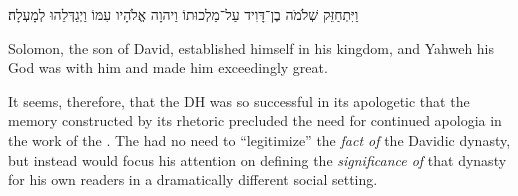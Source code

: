     \begin{hebrewtext}
        וַיִּתְחַזֵּק שְׁלֹמֹה בֶן־דָּוִיד עַל־מַלְכוּתוֹ וַיהוָה אֱלֹהָיו עִמּוֹ וַיְגַדְּלֵהוּ לְמָעְלָה׃
    \end{hebrewtext}
    \begin{translation}
        Solomon, the son of David, established himself in his kingdom, and Yahweh his God was with him and made him exceedingly great.   
    \end{translation}
\noindent
It seems, therefore, that the DH was so successful in its apologetic that the memory constructed by its rhetoric precluded the need for continued apologia in the work of the \chronicler. The \chronicler had no need to ``legitimize'' the \emph{fact of} the Davidic dynasty, but instead would focus his attention on defining the \emph{significance of} that dynasty for his own readers in a dramatically different social setting. 

